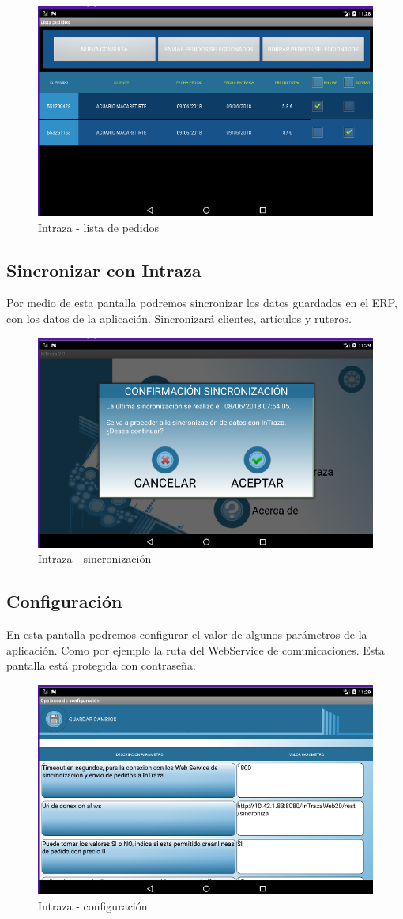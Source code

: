 \begin{figure}[H]
	\centering
	\includegraphics[width=0.7\linewidth]{figuras/manual/p9}
	\caption{Intraza - lista de pedidos}
	\label{fig:Itzp8}
\end{figure}

\subsection{Sincronizar con Intraza}

Por medio de esta pantalla podremos sincronizar los datos guardados en el ERP, con los datos de la aplicación. Sincronizará clientes, artículos y ruteros.

\begin{figure}[H]
	\centering
	\includegraphics[width=0.7\linewidth]{figuras/manual/p10}
	\caption{Intraza - sincronización}
	\label{fig:Itzp9}
\end{figure}

\subsection{Configuración}

En esta pantalla podremos configurar el valor de algunos parámetros de la aplicación. Como por ejemplo la ruta del WebService de comunicaciones. Esta pantalla está protegida con contraseña.

\begin{figure}[H]
	\centering
	\includegraphics[width=0.7\linewidth]{figuras/manual/p8}
	\caption{Intraza - configuración}
	\label{fig:Itzp10}
\end{figure}

